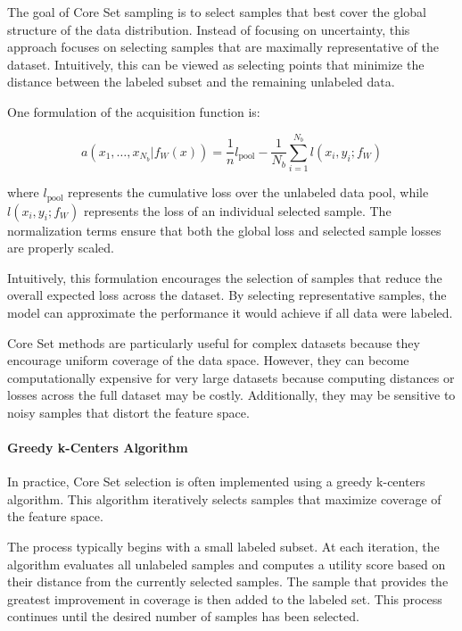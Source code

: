 \documentclass{article}
\begin{document}
The goal of Core Set sampling is to select samples that best cover the global structure of the data distribution. Instead of focusing on uncertainty, this approach focuses on selecting samples that are maximally representative of the dataset. Intuitively, this can be viewed as selecting points that minimize the distance between the labeled subset and the remaining unlabeled data.

One formulation of the acquisition function is:

\begin{equation}
a(x_1, \dots, x_{N_b} | f_W(x)) =
\frac{1}{n} l_{\text{pool}} -
\frac{1}{N_b} \sum_{i=1}^{N_b} l(x_i, y_i; f_W)
\end{equation}

where \(l_{\text{pool}}\) represents the cumulative loss over the unlabeled data pool, while \(l(x_i, y_i; f_W)\) represents the loss of an individual selected sample. The normalization terms ensure that both the global loss and selected sample losses are properly scaled.

Intuitively, this formulation encourages the selection of samples that reduce the overall expected loss across the dataset. By selecting representative samples, the model can approximate the performance it would achieve if all data were labeled.

Core Set methods are particularly useful for complex datasets because they encourage uniform coverage of the data space. However, they can become computationally expensive for very large datasets because computing distances or losses across the full dataset may be costly. Additionally, they may be sensitive to noisy samples that distort the feature space.

\paragraph{Greedy k-Centers Algorithm}

In practice, Core Set selection is often implemented using a greedy k-centers algorithm. This algorithm iteratively selects samples that maximize coverage of the feature space.

The process typically begins with a small labeled subset. At each iteration, the algorithm evaluates all unlabeled samples and computes a utility score based on their distance from the currently selected samples. The sample that provides the greatest improvement in coverage is then added to the labeled set. This process continues until the desired number of samples has been selected.
\end{document}
